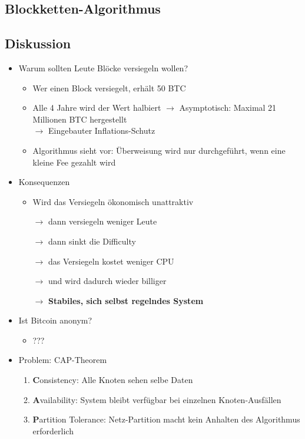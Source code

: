 \documentclass{article} %
\begin{document}
	\subsection{Blockketten-Algorithmus}
	\subsection{Diskussion}
		\begin{itemize}
			\item Warum sollten Leute Blöcke versiegeln wollen?
			\begin{itemize}
				\item Wer einen Block versiegelt, erhält 50 BTC
				\item Alle 4 Jahre wird der Wert halbiert $\rightarrow$ Asymptotisch: Maximal 21 Millionen BTC hergestellt\\				
				$\rightarrow$ Eingebauter Inflations-Schutz
				\item Algorithmus sieht vor: Überweisung wird nur durchgeführt, wenn eine kleine Fee gezahlt wird
			\end{itemize}
			\item Konsequenzen
			\begin{itemize}
				\item Wird das Versiegeln ökonomisch unattraktiv
				\item[$\rightarrow$] dann versiegeln weniger Leute
				\item[$\rightarrow$] dann sinkt die Difficulty
				\item[$\rightarrow$] das Versiegeln kostet weniger CPU
				\item[$\rightarrow$] und wird dadurch wieder billiger
				\item[$\rightarrow$]\textbf{Stabiles, sich selbst regelndes System}
			\end{itemize}
			\item Ist Bitcoin anonym?
			\begin{itemize}
				\item ???
			\end{itemize}
			\item Problem: CAP-Theorem
			\begin{enumerate}
				\item \textbf{C}onsistency: Alle Knoten sehen selbe Daten
				\item \textbf{A}vailability: System bleibt verfügbar bei einzelnen Knoten-Ausfällen
				\item \textbf{P}artition Tolerance: Netz-Partition macht kein Anhalten des Algorithmus erforderlich				

\end{enumerate}
\end{itemize}
\end{document}
